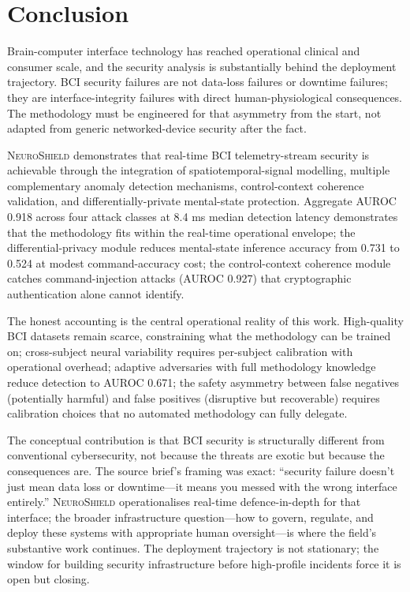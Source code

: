 \documentclass[sigconf,nonacm]{acmart}
\begin{document}
\section{Conclusion}

Brain-computer interface technology has reached operational
clinical and consumer scale, and the security analysis is
substantially behind the deployment trajectory. BCI security
failures are not data-loss failures or downtime failures; they
are interface-integrity failures with direct human-physiological
consequences. The methodology must be engineered for that
asymmetry from the start, not adapted from generic
networked-device security after the fact.

\textsc{NeuroShield} demonstrates that real-time BCI telemetry-stream
security is achievable through the integration of
spatiotemporal-signal modelling, multiple complementary anomaly
detection mechanisms, control-context coherence validation, and
differentially-private mental-state protection. Aggregate AUROC
0.918 across four attack classes at 8.4 ms median detection
latency demonstrates that the methodology fits within the
real-time operational envelope; the differential-privacy module
reduces mental-state inference accuracy from 0.731 to 0.524 at
modest command-accuracy cost; the control-context coherence module
catches command-injection attacks (AUROC 0.927) that
cryptographic authentication alone cannot identify.

The honest accounting is the central operational reality of this
work. High-quality BCI datasets remain scarce, constraining what
the methodology can be trained on; cross-subject neural variability
requires per-subject calibration with operational overhead;
adaptive adversaries with full methodology knowledge reduce
detection to AUROC 0.671; the safety asymmetry between false
negatives (potentially harmful) and false positives (disruptive
but recoverable) requires calibration choices that no automated
methodology can fully delegate.

The conceptual contribution is that BCI security is structurally
different from conventional cybersecurity, not because the threats
are exotic but because the consequences are. The source brief's
framing was exact: ``security failure doesn't just mean data loss
or downtime---it means you messed with the wrong interface
entirely.'' \textsc{NeuroShield} operationalises real-time
defence-in-depth for that interface; the broader infrastructure
question---how to govern, regulate, and deploy these systems with
appropriate human oversight---is where the field's substantive
work continues. The deployment trajectory is not stationary; the
window for building security infrastructure before high-profile
incidents force it is open but closing.
\end{document}

